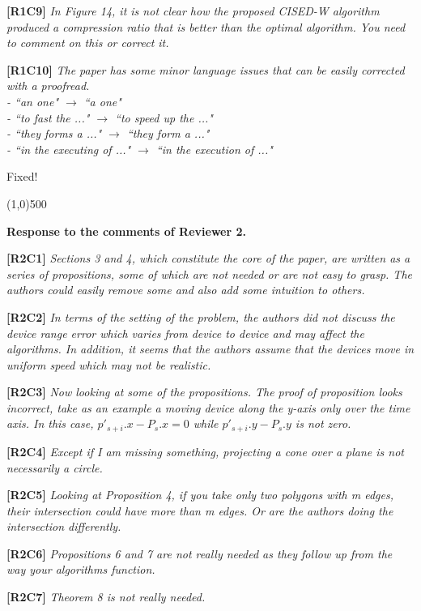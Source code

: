 \documentclass{letter}
\begin{document}
\textbf{[R1C9]} \emph{In Figure 14, it is not clear how the proposed CISED-W algorithm produced a compression ratio that is better than the optimal algorithm. You need to comment on this or correct it.}

\textbf{[R1C10]} \emph{The paper has some minor language issues that can be easily corrected with a proofread.\\
- ``an one" $\rightarrow$ ``a one" \\
- ``to fast the ..." $\rightarrow$ ``to speed up the ..." \\
- ``they forms a ..." $\rightarrow$ ``they form a ..."	\\
- ``in the executing of ..." $\rightarrow$ ``in the execution of ..."
}


Fixed!

\line(1,0){500}

\textbf{Response to the comments of Reviewer 2.}

\textbf{[R2C1]} \emph{Sections 3 and 4, which constitute the core of the paper, are written as a series of propositions, some of which are not needed or are not easy to grasp.
The authors could easily remove some and also add some intuition to others.}

\textbf{[R2C2]} \emph{In terms of the setting of the problem, the authors did not discuss the device range error which varies from device to device and may affect the algorithms.
In addition, it seems that the authors assume that the devices move in uniform speed which may not be realistic.
}

\textbf{[R2C3]} \emph{Now looking at some of the propositions.
The proof of proposition looks incorrect, take as an example a moving device along the y-axis only over the time axis. In this case, $p'_{s+i}.x - P_s.x = 0$ while $p'_{s+i}.y - P_s.y$ is not zero.
}

\textbf{[R2C4]} \emph{Except if I am missing something, projecting a cone over a plane is not necessarily a circle.}

\textbf{[R2C5]} \emph{Looking at Proposition 4, if you take only two polygons with m edges, their intersection could have more than m edges. Or are the authors doing the intersection differently.}

\textbf{[R2C6]} \emph{Propositions 6 and 7 are not really needed as they follow up from the way your algorithms function.}

\textbf{[R2C7]} \emph{Theorem 8 is not really needed.}
\end{document}
